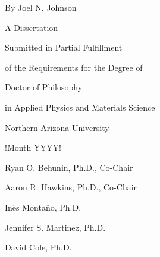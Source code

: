 \begin{centering}
\begin{large}
\begin{spacing}{1.8}

\vspace*{\baselineskip}

\dissertationTitle{}

\thispagestyle{empty} %

\vspace{\baselineskip}

By Joel N. Johnson


A Dissertation

Submitted in Partial Fulfillment

of the Requirements for the Degree of


Doctor of Philosophy

in Applied Physics and Materials Science

\vspace{\baselineskip}

Northern Arizona University

!Month YYYY!

\vspace{2\baselineskip}


Ryan O. Behunin, Ph.D., Co-Chair

Aaron R. Hawkins, Ph.D., Co-Chair

Inès Montaño, Ph.D.

Jennifer S. Martinez, Ph.D.

David Cole, Ph.D.

\end{spacing}
\end{large}
\end{centering}
